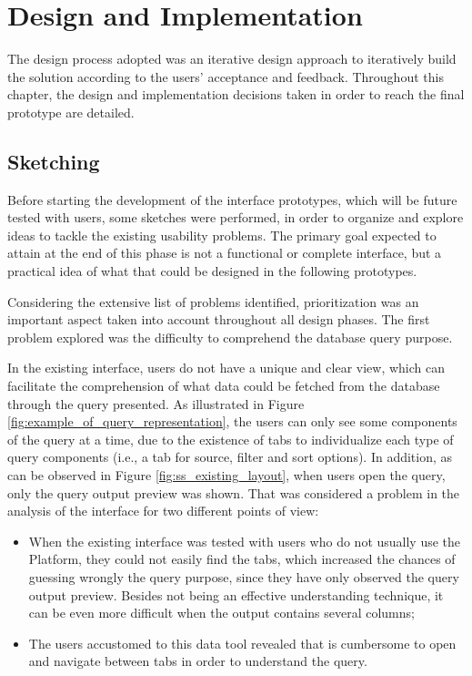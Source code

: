 

\chapter{Design and Implementation}
\label{cha:design_and_implementation}

The design process adopted was an iterative design approach to iteratively build the solution according to the users' acceptance and feedback. Throughout this chapter, the design and implementation decisions taken in order to reach the final prototype are detailed.

\section{Sketching}
\label{sec:sketching}

Before starting the development of the interface prototypes, which will be future tested with users, some sketches were performed, in order to organize and explore ideas to tackle the existing usability problems. The primary goal expected to attain at the end of this phase is not a functional or complete interface, but a practical idea of what that could be designed in the following prototypes.

Considering the extensive list of problems identified, prioritization was an important aspect taken into account throughout all design phases. The first problem explored was the difficulty to comprehend the database query purpose.

In the existing interface, users do not have a unique and clear view, which can facilitate the comprehension of what data could be fetched from the database through the query presented. As illustrated in Figure \ref{fig:example_of_query_representation}, the users can only see some components of the query at a time, due to the existence of tabs to individualize each type of query components (i.e., a tab for source, filter and sort options). In addition, as can be observed in Figure \ref{fig:ss_existing_layout}, when users open the query, only the query output preview was shown. That was considered a problem in the analysis of the interface for two different points of view:

\begin{itemize}
    \item When the existing interface was tested with users who do not usually use the Platform, they could not easily find the tabs, which increased the chances of guessing wrongly the query purpose, since they have only observed the query output preview. Besides not being an effective understanding technique, it can be even more difficult when the output contains several columns;
    \item The users accustomed to this data tool revealed that is cumbersome to open and navigate between tabs in order to understand the query.
\end{itemize}

